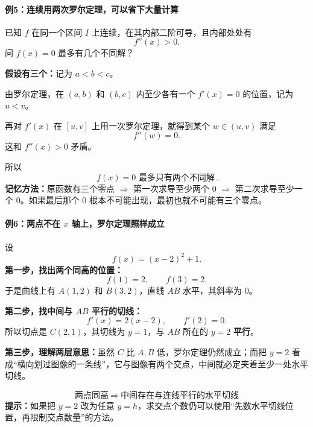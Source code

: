 \begin{examplebox}
\par\medskip
\noindent\begin{minipage}{\linewidth}
\paragraph{例5：连续用两次罗尔定理，可以省下大量计算}
\begin{center}\end{center}
\end{minipage}\par\medskip

已知 $f$ 在同一个区间 $I$ 上连续，在其内部二阶可导，且内部处处有
\[
f''(x)>0.
\]
问 $f(x)=0$ 最多有几个不同解？

\textbf{假设有三个：}记为 $a<b<c$。

由罗尔定理，在 $(a,b)$ 和 $(b,c)$ 内至少各有一个 $f'(x)=0$ 的位置，记为 $u<v$。

再对 $f'(x)$ 在 $[u,v]$ 上用一次罗尔定理，就得到某个 $w\in(u,v)$ 满足
\[
f''(w)=0.
\]
这和 $f''(x)>0$ 矛盾。

所以
\[
\boxed{\ f(x)=0\text{ 最多只有两个不同解}\ }.
\]
\textbf{记忆方法：}原函数有三个零点 $\Rightarrow$ 第一次求导至少两个 $0$ $\Rightarrow$ 第二次求导至少一个 $0$。如果最后那个 $0$ 根本不可能出现，最初也就不可能有三个零点。
\end{examplebox}

\clearpage
\begin{examplebox}
\paragraph{例6：两点不在 $x$ 轴上，罗尔定理照样成立}

设
\[
 f(x)=(x-2)^2+1.
\]
\textbf{第一步，找出两个同高的位置：}
\[
 f(1)=2,\qquad f(3)=2.
\]
于是曲线上有 $A(1,2)$ 和 $B(3,2)$，直线 $AB$ 水平，其斜率为 $0$。

\textbf{第二步，找中间与 $AB$ 平行的切线：}
\[
 f'(x)=2(x-2),\qquad f'(2)=0.
\]
所以切点是 $C(2,1)$，其切线为 $y=1$，与 $AB$ 所在的 $y=2$ \textbf{平行}。

\textbf{第三步，理解两层意思：}虽然 $C$ 比 $A,B$ 低，罗尔定理仍然成立；而把 $y=2$ 看成“横向划过图像的一条线”，它与图像有两个交点，中间就必定夹着至少一处水平切线。

\[
\boxed{\ \text{两点同高}\ \Longrightarrow\ \text{中间存在与连线平行的水平切线}\ }
\]
\textbf{提示：}如果把 $y=2$ 改为任意 $y=h$，求交点个数仍可以使用“先数水平切线位置，再限制交点数量”的方法。
\end{examplebox}


